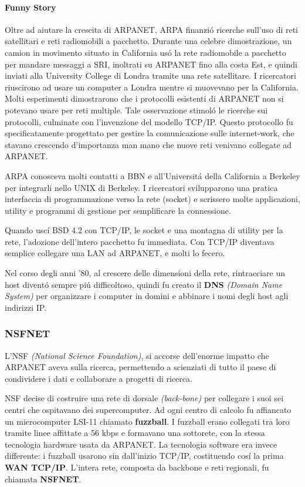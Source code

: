 \documentclass[12pt]{article}
\begin{document}
\paragraph{Funny Story} Oltre ad aiutare la crescita di ARPANET, ARPA finanzi\'o ricerche sull'uso di reti satellitari e reti 
radiomobili a pacchetto. Durante una celebre dimostrazione, un camion in movimento situato in California us\'o la rete radiomobile a 
pacchetto per mandare messaggi a SRI, inoltrati su ARPANET fino alla costa Est, e quindi inviati alla University College di Londra 
tramite una rete satellitare. I ricercatori riuscirono ad usare un computer a Londra mentre si muovevano per la California.\\

Molti esperimenti dimostrarono che i protocolli esistenti di ARPANET non si potevano usare per reti multiple. Tale osservazione 
stimol\'o le ricerche sui protocolli, culminate con l'invenzione del modello TCP/IP. Questo protocollo fu specificatamente progettato 
per gestire la comunicazione sulle internet-work, che stavano crescendo d'importanza man mano che nuove reti venivano collegate ad 
ARPANET.

ARPA conosceva molti contatti a BBN e all'Universit\'a della California a Berkeley per integrarli nello UNIX di Berkeley. I 
ricercatori svilupparono una pratica interfaccia di programmazione verso la rete (socket) e scrissero molte applicazioni, utility e 
programmi di gestione per semplificare la connessione.

Quando usc\'i BSD 4.2 con TCP/IP, le socket e una montagna di utility per la rete, l'adozione dell'intero pacchetto fu immediata. 
Con TCP/IP diventava semplice collegare una LAN ad ARPANET, e molti lo fecero.

Nel corso degli anni '80, al crescere delle dimensioni della rete, rintracciare un host divent\'o sempre pi\'u difficoltoso, quindi 
fu creato il \textbf{DNS} \textit{(Domain Name System)} per organizzare i computer in domini e abbinare i nomi degli host agli 
indirizzi IP.

\subsubsection{NSFNET}\label{nsfnet}
L'NSF \textit{(National Science Foundation)}, si accorse dell'enorme impatto che ARPANET aveva sulla ricerca, permettendo a 
scienziati di tutto il paese di condividere i dati e collaborare a progetti di ricerca.

NSF decise di costruire una rete di dorsale \textit{(back-bone)} per collegare i suoi sei centri che ospitavano dei supercomputer. 
Ad ogni centro di calcolo fu affiancato un microcomputer LSI-11 chiamato \textbf{fuzzball}. I fuzzball erano collegati tra loro 
tramite linee affittate a 56 kbps e formavano una sottorete, con la stessa tecnologia hardware usata da ARPANET. La tecnologia 
software era invece differente: i fuzzball usarono sin dall'inizio TCP/IP, costituendo cos\'i la prima \textbf{WAN TCP/IP}.
L'intera rete, composta da backbone e reti regionali, fu chiamata \textbf{NSFNET}.
\end{document}
